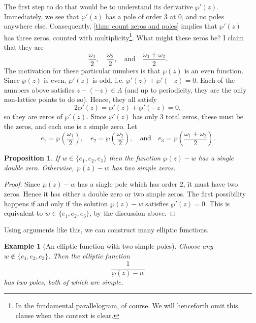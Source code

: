 \documentclass[12pt,reqno]{amsart}
\theoremstyle{plain}
\newtheorem{prop}[thm]{Proposition}
\newtheorem{eg}{Example}
\numberwithin{equation}{section}
\begin{document}
The first step to do that would be to understand its derivative $\wp'(z)$. Immediately, we see that $\wp'(z)$ has a pole of order $3$ at $0$, and no poles anywhere else. Consequently, \cref{thm: count zeros and poles} implies that $\wp'(z)$ has three zeros, counted with multiplicity\footnote{In the fundamental parallelogram, of course. We will henceforth omit this clause when the context is clear.}. What might these zeros be? I claim that they are
\[\frac{\omega_1}{2}, \quad \frac{\omega_2}{2}, \quad \text{and}\quad \frac{\omega_1+\omega_2}{2}.\]
The motivation for these particular numbers is that $\wp(z)$ is an even function. Since $\wp(z)$ is even, $\wp'(z)$ is odd, i.e. $\wp'(z) + \wp'(-z) = 0$. Each of the numbers above satisfies $z - (-z)\in \Lambda$ (and up to periodicity, they are the only non-lattice points to do so). Hence, they all satisfy
\[2\wp'(z) = \wp'(z) +\wp'(-z)=0, \]
so they are zeros of $\wp'(z)$. Since $\wp'(z)$ has only 3 total zeros, these must be the zeros, and each one is a simple zero. 
Let
\[e_1 = \wp\left(\frac{\omega_1}{2}\right), \quad e_2 = \wp\left(\frac{\omega_2}{2}\right), \quad \text{and}\quad e_3 = \wp\left(\frac{\omega_1+\omega_2}{2}\right).\]
\begin{prop}\label{prop: simple roots}
    If $w\in\{e_1,e_2,e_3\}$ then the function $\wp(z)-w$ has a single double zero. Otherwise, $\wp(z) -w$ has two simple zeros.
\end{prop}
\begin{proof}
    Since $\wp(z) - w$ has a single pole which has order 2, it must have two zeros. Hence it has either a double zero or two simple zeros. The first possibility happens if and only if the solution $\wp(z) - w$ satisfies $\wp'(z)=0$. This is equivalent to $w\in \{e_1,e_2,e_3\}$, by the discussion above. 
\end{proof}
Using arguments like this, we can construct many elliptic functions.
\begin{leftbar}
\begin{eg}[An elliptic function with two simple poles]
    Choose any $w\not\in \{e_1,e_2,e_3\}$. Then the elliptic function \[\frac{1}{\wp(z)-w}\] has two poles, both of which are simple.
\end{eg}
\end{leftbar}
\end{document}
